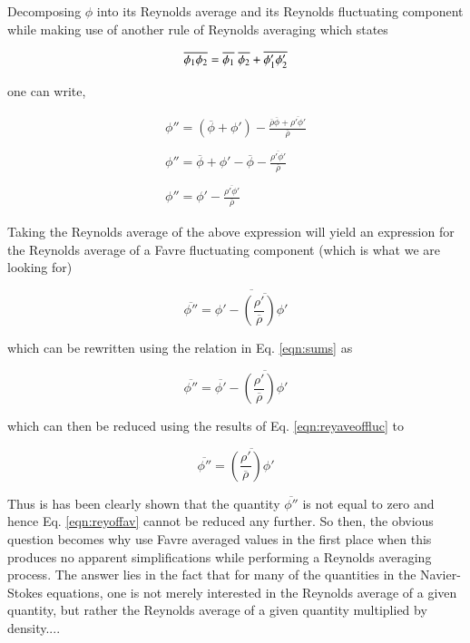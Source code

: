 	Decomposing $\phi$ into its Reynolds average and its Reynolds fluctuating component while making use 
of another rule of Reynolds averaging which states

\begin{equation}
	\overline{\phi_1 \phi_2} = \overline{\phi_1} \hspace{0.1cm}\overline{\phi_2} + \overline{\phi_1' \phi_2'}
\label{eqn:product}
\end{equation}

	one can write,

\begin{displaymath}
	\begin{array}{c}
		\phi'' = (\overline{\phi} + \phi') - \frac{\overline{\rho}\overline{\phi} + \overline{\rho'\phi'}}
			{\overline{\rho}} \\ \\
		\phi'' = \overline{\phi} + \phi' - \overline{\phi} - \frac{\overline{\rho'\phi'}}
			{\overline{\rho}} \\ \\
		\phi'' = \phi' - \frac{\overline{\rho'\phi'}}{\overline{\rho}}
	\end{array}
\end{displaymath}

	Taking the Reynolds average of the above expression will yield an expression for the Reynolds average
of a Favre fluctuating component (which is what we are looking for)

\begin{displaymath}
	\overline{\phi''} = \overline{\phi' - \overline{(\frac{\rho'}{\overline{\rho}})\phi'}}
\end{displaymath}

	which can be rewritten using the relation in Eq. \ref{eqn:sums} as

\begin{displaymath}
	\overline{\phi''} = \overline{\phi'} - \overline{(\frac{\rho'}{\overline{\rho}})\phi'}
\end{displaymath}

	which can then be reduced using the results of Eq. \ref{eqn:reyaveoffluc} to

\begin{equation}
	\overline{\phi''} = \overline{(\frac{\rho'}{\overline{\rho}})\phi'}
\label{eqn:reyoffavfluc}
\end{equation}

	Thus is has been clearly shown that the quantity $\overline{\phi''}$ is not equal to zero and hence
Eq. \ref{eqn:reyoffav} cannot be reduced any further.  So then, the obvious question becomes why use Favre
averaged values in the first place when this produces no apparent simplifications while performing a Reynolds averaging
process.  The answer lies in the fact that for many of the quantities in the Navier-Stokes equations, one is not merely 
interested in the Reynolds average of a given quantity, but rather the Reynolds average of a given quantity
multiplied by density....

